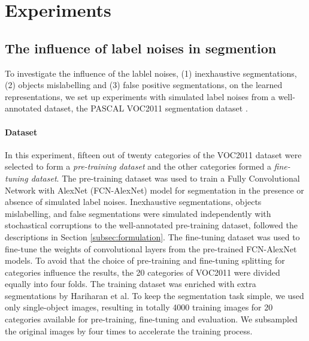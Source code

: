 \section{Experiments}
\label{sec:experiments}

\subsection{The influence of label noises in segmention}
\label{subsec:robustness}


To investigate the influence of the lablel noises, (1) inexhaustive segmentations, (2) objects mislabelling and (3) false positive segmentations, on the learned representations, we set up experiments with simulated label noises from a well-annotated dataset, the PASCAL VOC2011 segmentation dataset \cite{everingham2015pascal}.

\paragraph{Dataset}
In this experiment, fifteen out of twenty categories of the VOC2011 dataset were selected to form a \textit{pre-training dataset} and the other categories formed a \textit{fine-tuning dataset}.
The pre-training dataset was used to train a Fully Convolutional Network with AlexNet (FCN-AlexNet) model \cite{long2015fully} for segmentation in the presence or absence of simulated label noises.
Inexhaustive segmentations, objects mislabelling, and false segmentations were simulated independently with stochastical corruptions to the well-annotated pre-training dataset, followed the descriptions in Section \ref{subsec:formulation}.
The fine-tuning dataset was used to fine-tune the weights of convolutional layers from the pre-trained FCN-AlexNet models.
To avoid that the choice of pre-training and fine-tuning splitting for categories influence the results, the 20 categories of VOC2011 were divided equally into four folds.
The training dataset was enriched with extra segmentations by Hariharan et al. \cite{hariharan2011semantic}
To keep the segmentation task simple, we used only single-object images, resulting in totally 4000 training images for 20 categories available for pre-training, fine-tuning and evaluation.
We subsampled the original images by four times to accelerate the training process.

